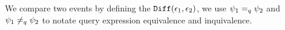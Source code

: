  We compare two events by defining the $\mathtt{Diff}(\mathtt{\epsilon}_1, \mathtt{\epsilon}_2)$, we use $\psi_1 =_{q} \psi_2$ and $\psi_1 \neq_{q} \psi_2$ to notate query expression equivalence and inquivalence. 
%
%

